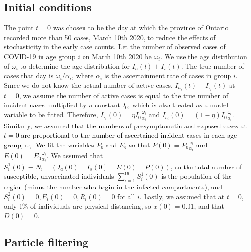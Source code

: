 \subsection{Initial conditions}
\label{initial_conditions}
The point $t = 0$ was chosen to be the day at which the province of Ontario recorded more than 50 cases, March 10th 2020, to reduce the effects of stochasticity in the early case counts. Let the number of observed cases of COVID-19 in age group $i$ on March 10th 2020 be $\omega_i$. We use the age distribution of $\omega_i$ to determine the age distribution for $I_a(t) + I_s(t)$. The true number of cases that day is $\omega_i / \alpha_i$, where $\alpha_i$ is the ascertainment rate of cases in group $i$. Since we do not know the actual number of active cases, $I_{a_i}(t) + I_{s_i}(t)$ at $t = 0$, we assume the number of active cases is equal to the true number of incident cases multiplied by a constant $I_0$, which is also treated as a model variable to be fitted. Therefore, $I_{s_i}(0) = \eta I_0 \frac{\omega_i}{\alpha_i}$ and $I_{a_i}(0) = (1 - \eta) I_0 \frac{\omega_i}{\alpha_i}$.
\textcolor{black}{Similarly, we assumed that the numbers of presymptomatic and exposed cases at $t = 0$ are proportional to the number of ascertained incident cases in each age group, $\omega_i$. We fit the variables $P_0$ and $E_0$ so that $P(0) = P_0 \frac{\omega_i}{\alpha_i}$ and  $E(0) = E_0 \frac{\omega_i}{\alpha_i}$.} We assumed that\textcolor{black}{$S^1_i(0) = N_i  - (I_a(0) + I_s(0) + E(0) + P(0))$, so the total number of susceptible, unvaccinated individuals $\sum_{i = 1}^{16} S^1_i(0)$ is the population of the region (minus the number who begin in the infected compartments)}, and $S^2_i(0) = 0, E_i(0) = 0, R_i(0) = 0$ for all $i$. Lastly, we assumed that at $t = 0$, only 1\% of individuals are physical distancing, so $x(0) = 0.01$, and that $D(0) = 0$.

\subsection{Particle filtering}

